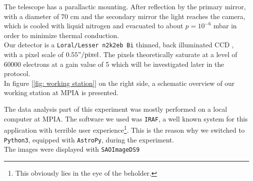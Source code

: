 The telescope has a parallactic mounting. After reflection by the primary mirror, with a diameter of 70 cm and the secondary mirror the light reaches the camera, which is cooled with liquid nitrogen and evacuated to about $p = 10^{-6}$ mbar in order to minimize thermal conduction.  \\
Our detector is a \texttt{Loral/Lesser n2k2eb Bi} thinned, back illuminated CCD , with a pixel scale of $0.55"/\text{pixel}$. The pixels theoretically saturate at a level of 60000 electrons at a gain value of 5 which will be investigated later in the protocol.\\
In figure [\ref{fig: working station}] on the right side, a schematic overview of our working station at MPIA is presented.

The data analysis part of this experiment was mostly performed on a local computer at MPIA. 
The software we used was \texttt{IRAF}, a well known system for this application with terrible user experience\footnote{This obviously lies in the eye of the beholder.}. This is the reason why we switched to \texttt{Python3}, equipped with \texttt{AstroPy}, during the experiment. \\
The images were displayed with \texttt{SAOImageDS9}